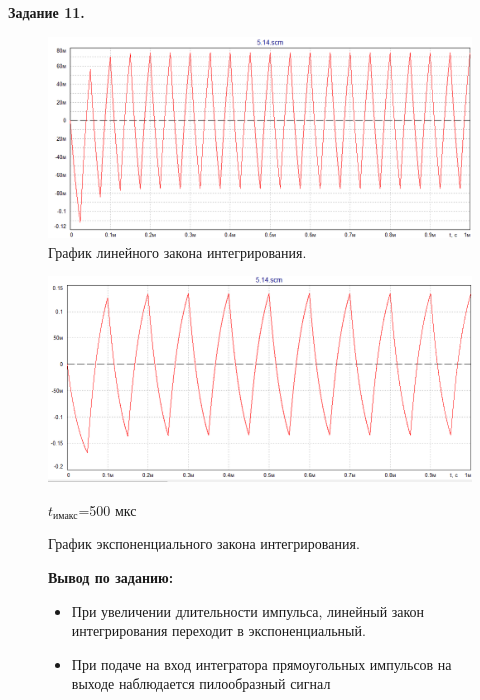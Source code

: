 \documentclass[a4paper,14pt]{extarticle}
\begin{document}
    \begin{center}
        \textbf{Задание 11.}
    \end{center}
    
    \begin{figure}[h!]
        \begin{center}
            \includegraphics[scale=0.5]{28.png}
        \end{center}
        \vspace{-0.7cm}
        \caption{График линейного закона интегрирования.}
    \end{figure}

    \begin{figure}[h!]
        \begin{center}
            \includegraphics[scale=0.5]{29.png}
        \end{center}
        \vspace{-0.7cm}
        \caption{График экспоненциального закона интегрирования.}
        $t_\text{имакс}$=500 мкс
    \end{figure}
    \begin{figure}[h!]
       \textbf{Вывод по заданию:}

        \begin{itemize}
            \item При увеличении длительности импульса, линейный закон 
            интегрирования переходит в экспоненциальный.
            \item При подаче на вход интегратора прямоугольных импульсов на 
            выходе наблюдается пилообразный сигнал
        \end{itemize}
    \end{figure}
\end{document}
